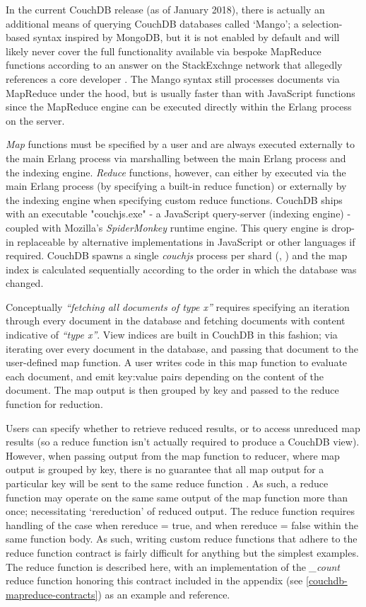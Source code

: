 In the current CouchDB release (as of January 2018), there is actually an additional means of querying CouchDB databases called `Mango'; a selection-based syntax inspired by MongoDB, but it is not enabled by default and will likely never cover the full functionality available via bespoke MapReduce functions according to an answer on the StackExchnge network that allegedly references a core developer \cite{Mango}. The Mango syntax still processes documents via MapReduce under the hood, but is usually faster than with JavaScript functions since the MapReduce engine can be executed directly within the Erlang process on the server.

\textit{Map} functions must be specified by a user and are always executed externally to the main Erlang process via marshalling between the main Erlang process and the indexing engine. \textit{Reduce} functions, however, can either by executed via the main Erlang process (by specifying a built-in reduce function) or externally by the indexing engine when specifying custom reduce functions. CouchDB ships with an executable "couchjs.exe" - a JavaScript query-server (indexing engine) - coupled with Mozilla's \textit{SpiderMonkey} runtime engine. This query engine is drop-in replaceable by alternative implementations in JavaScript or other languages if required. CouchDB spawns a single \textit{couchjs} process per shard (\cite{slack2Nov}, \cite{slack7Nov}) and the map index is calculated sequentially according to the order in which the database was changed.

Conceptually \textit{``fetching all documents of type x''} requires specifying an iteration through every document in the database and fetching documents with content indicative of \textit{``type x''}. View indices are built in CouchDB in this fashion; via iterating over every document in the database, and passing that document to the user-defined map function. A user writes code in this map function to evaluate each document, and emit key:value pairs depending on the content of the document. The map output is then grouped by key and passed to the reduce function for reduction.

Users can specify whether to retrieve reduced results, or to access unreduced map results (so a reduce function isn't actually required to produce a CouchDB view). However, when passing output from the map function to reducer, where map output is grouped by key, there is no guarantee that all map output for a particular key will be sent to the same reduce function \cite{reduceFunctions}. As such, a reduce function may operate on the same same output of the map function more than once; necessitating `rereduction' of reduced output. The reduce function requires handling of the case when rereduce = true, and when rereduce = false within the same function body. As such, writing custom reduce functions that adhere to the reduce function contract is fairly difficult for anything but the simplest examples. The reduce function is described here, with an implementation of the \textit{\_count} reduce function honoring this contract included in the appendix (see \ref{couchdb-mapreduce-contracts}) as an example and reference.

